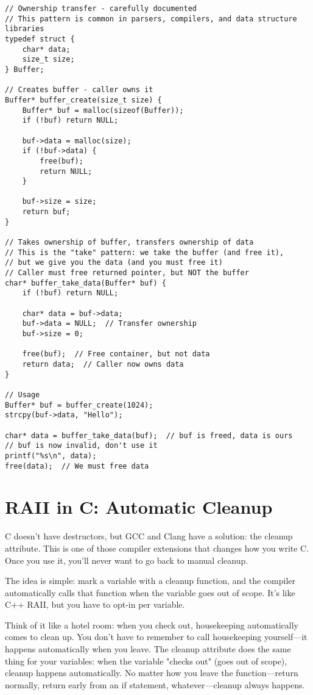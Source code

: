 \begin{lstlisting}
// Ownership transfer - carefully documented
// This pattern is common in parsers, compilers, and data structure libraries
typedef struct {
    char* data;
    size_t size;
} Buffer;

// Creates buffer - caller owns it
Buffer* buffer_create(size_t size) {
    Buffer* buf = malloc(sizeof(Buffer));
    if (!buf) return NULL;

    buf->data = malloc(size);
    if (!buf->data) {
        free(buf);
        return NULL;
    }

    buf->size = size;
    return buf;
}

// Takes ownership of buffer, transfers ownership of data
// This is the "take" pattern: we take the buffer (and free it),
// but we give you the data (and you must free it)
// Caller must free returned pointer, but NOT the buffer
char* buffer_take_data(Buffer* buf) {
    if (!buf) return NULL;

    char* data = buf->data;
    buf->data = NULL;  // Transfer ownership
    buf->size = 0;

    free(buf);  // Free container, but not data
    return data;  // Caller now owns data
}

// Usage
Buffer* buf = buffer_create(1024);
strcpy(buf->data, "Hello");

char* data = buffer_take_data(buf);  // buf is freed, data is ours
// buf is now invalid, don't use it
printf("%s\n", data);
free(data);  // We must free data
\end{lstlisting}

\section{RAII in C: Automatic Cleanup}

C doesn't have destructors, but GCC and Clang have a solution: the cleanup attribute. This is one of those compiler extensions that changes how you write C. Once you use it, you'll never want to go back to manual cleanup.

The idea is simple: mark a variable with a cleanup function, and the compiler automatically calls that function when the variable goes out of scope. It's like C++ RAII, but you have to opt-in per variable.

Think of it like a hotel room: when you check out, housekeeping automatically comes to clean up. You don't have to remember to call housekeeping yourself---it happens automatically when you leave. The cleanup attribute does the same thing for your variables: when the variable "checks out" (goes out of scope), cleanup happens automatically. No matter how you leave the function---return normally, return early from an if statement, whatever---cleanup always happens.

